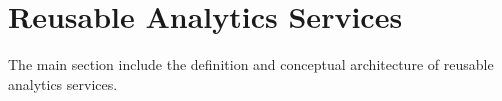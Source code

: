 \section{Reusable Analytics Services}

The main section include the definition and conceptual
architecture of reusable analytics services.
















